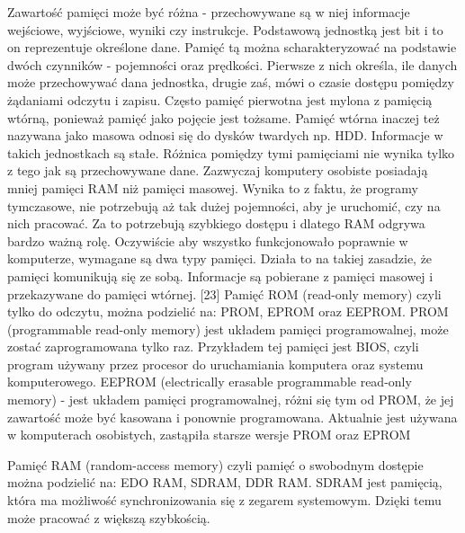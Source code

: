 \documentclass[12pt, a4paper, onside, polish]{article}				%
\begin{document}
 

Zawartość pamięci może być różna - przechowywane są w niej informacje wejściowe, wyjściowe, wyniki czy instrukcje. Podstawową jednostką jest bit i to on reprezentuje określone dane. Pamięć tą można scharakteryzować na podstawie dwóch czynników - pojemności oraz prędkości. Pierwsze z nich określa, ile danych może przechowywać dana jednostka, drugie zaś, mówi o czasie dostępu pomiędzy żądaniami odczytu i zapisu. Często pamięć pierwotna jest mylona z pamięcią wtórną, ponieważ pamięć jako pojęcie jest tożsame. Pamięć wtórna inaczej też nazywana jako masowa odnosi się do dysków twardych np. HDD. Informacje w takich jednostkach są stałe. Różnica pomiędzy tymi pamięciami nie wynika tylko z tego jak są przechowywane dane. Zazwyczaj komputery osobiste posiadają mniej pamięci RAM niż pamięci masowej. Wynika to z faktu, że programy tymczasowe, nie potrzebują aż tak dużej pojemności, aby je uruchomić, czy na nich pracować. Za to potrzebują szybkiego dostępu i dlatego RAM odgrywa bardzo ważną rolę. Oczywiście aby wszystko funkcjonowało poprawnie w komputerze, wymagane są dwa typy pamięci. Działa to na takiej zasadzie, że pamięci komunikują się ze sobą. Informacje są pobierane z pamięci masowej i przekazywane do pamięci wtórnej. [23] 
\newline\newline
Pamięć ROM (read-only memory) czyli tylko do odczytu, można podzielić na: PROM, EPROM oraz EEPROM.  \newline\newline
PROM (programmable read-only memory) jest układem pamięci programowalnej, może zostać zaprogramowana tylko raz. Przykładem tej pamięci jest BIOS, czyli program używany przez procesor do uruchamiania komputera oraz systemu komputerowego. \newline\newline
EEPROM (electrically erasable programmable read-only memory) - jest układem pamięci programowalnej, różni się tym od PROM, że jej zawartość może być kasowana i ponownie programowana. Aktualnie jest używana w komputerach osobistych, zastąpiła starsze wersje PROM oraz EPROM \newline\newline

 
Pamięć RAM (random-access memory) czyli pamięć o swobodnym dostępie można podzielić na: EDO RAM, SDRAM, DDR RAM. \newline\newline
SDRAM jest pamięcią, która ma możliwość synchronizowania się z zegarem systemowym. Dzięki temu może pracować z większą szybkością. \newline\newline
\end{document}
